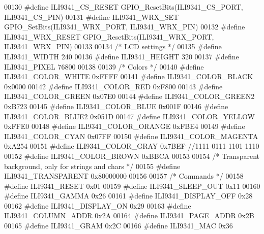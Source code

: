 \begin{DoxyCode}
00130 \textcolor{preprocessor}{#define ILI9341\_CS\_RESET            GPIO\_ResetBits(ILI9341\_CS\_PORT, ILI9341\_CS\_PIN)}
00131 \textcolor{preprocessor}{#define ILI9341\_WRX\_SET             GPIO\_SetBits(ILI9341\_WRX\_PORT, ILI9341\_WRX\_PIN)}
00132 \textcolor{preprocessor}{#define ILI9341\_WRX\_RESET           GPIO\_ResetBits(ILI9341\_WRX\_PORT, ILI9341\_WRX\_PIN)}
00133 
00134 \textcolor{comment}{/* LCD settings */}
00135 \textcolor{preprocessor}{#define ILI9341\_WIDTH               240}
00136 \textcolor{preprocessor}{#define ILI9341\_HEIGHT              320}
00137 \textcolor{preprocessor}{#define ILI9341\_PIXEL               76800}
00138 
00139 \textcolor{comment}{/* Colors */}
00140 \textcolor{preprocessor}{#define ILI9341\_COLOR\_WHITE         0xFFFF}
00141 \textcolor{preprocessor}{#define ILI9341\_COLOR\_BLACK         0x0000}
00142 \textcolor{preprocessor}{#define ILI9341\_COLOR\_RED           0xF800}
00143 \textcolor{preprocessor}{#define ILI9341\_COLOR\_GREEN         0x07E0}
00144 \textcolor{preprocessor}{#define ILI9341\_COLOR\_GREEN2        0xB723}
00145 \textcolor{preprocessor}{#define ILI9341\_COLOR\_BLUE          0x001F}
00146 \textcolor{preprocessor}{#define ILI9341\_COLOR\_BLUE2         0x051D}
00147 \textcolor{preprocessor}{#define ILI9341\_COLOR\_YELLOW        0xFFE0}
00148 \textcolor{preprocessor}{#define ILI9341\_COLOR\_ORANGE        0xFBE4}
00149 \textcolor{preprocessor}{#define ILI9341\_COLOR\_CYAN          0x07FF}
00150 \textcolor{preprocessor}{#define ILI9341\_COLOR\_MAGENTA       0xA254}
00151 \textcolor{preprocessor}{#define ILI9341\_COLOR\_GRAY          0x7BEF //1111 0111 1101 1110}
00152 \textcolor{preprocessor}{#define ILI9341\_COLOR\_BROWN         0xBBCA}
00153 
00154 \textcolor{comment}{/* Transparent background, only for strings and chars */}
00155 \textcolor{preprocessor}{#define ILI9341\_TRANSPARENT         0x80000000}
00156 
00157 \textcolor{comment}{/* Commands */}
00158 \textcolor{preprocessor}{#define ILI9341\_RESET               0x01}
00159 \textcolor{preprocessor}{#define ILI9341\_SLEEP\_OUT           0x11}
00160 \textcolor{preprocessor}{#define ILI9341\_GAMMA               0x26}
00161 \textcolor{preprocessor}{#define ILI9341\_DISPLAY\_OFF         0x28}
00162 \textcolor{preprocessor}{#define ILI9341\_DISPLAY\_ON          0x29}
00163 \textcolor{preprocessor}{#define ILI9341\_COLUMN\_ADDR         0x2A}
00164 \textcolor{preprocessor}{#define ILI9341\_PAGE\_ADDR           0x2B}
00165 \textcolor{preprocessor}{#define ILI9341\_GRAM                0x2C}
00166 \textcolor{preprocessor}{#define ILI9341\_MAC                 0x36}

\end{DoxyCode}
